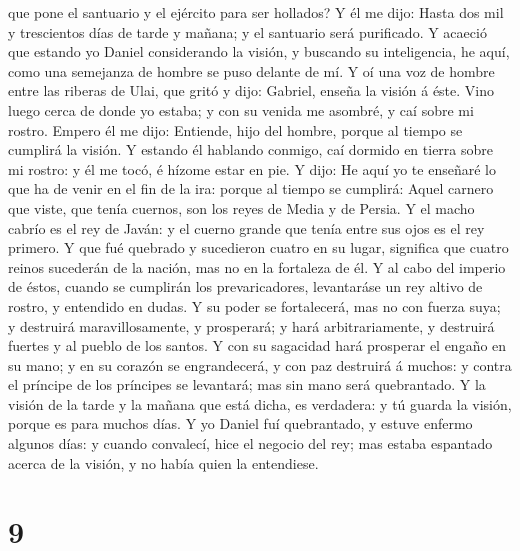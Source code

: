 que pone el santuario y el ejército para ser hollados?  Y
él me dijo: Hasta dos mil y trescientos días de tarde y mañana; y el
santuario será purificado.  Y acaeció que estando yo Daniel
considerando la visión, y buscando su inteligencia, he aquí, como una
semejanza de hombre se puso delante de mí.  Y oí una voz de
hombre entre las riberas de Ulai, que gritó y dijo: Gabriel, enseña la
visión á éste.  Vino luego cerca de donde yo estaba; y con
su venida me asombré, y caí sobre mi rostro. Empero él me dijo:
Entiende, hijo del hombre, porque al tiempo se cumplirá la visión.
 Y estando él hablando conmigo, caí dormido en tierra sobre
mi rostro: y él me tocó, é hízome estar en pie.  Y dijo: He
aquí yo te enseñaré lo que ha de venir en el fin de la ira: porque al
tiempo se cumplirá:  Aquel carnero que viste, que tenía
cuernos, son los reyes de Media y de Persia.  Y el macho
cabrío es el rey de Javán: y el cuerno grande que tenía entre sus ojos
es el rey primero.  Y que fué quebrado y sucedieron cuatro
en su lugar, significa que cuatro reinos sucederán de la nación, mas no
en la fortaleza de él.  Y al cabo del imperio de éstos,
cuando se cumplirán los prevaricadores, levantaráse un rey altivo de
rostro, y entendido en dudas.  Y su poder se fortalecerá,
mas no con fuerza suya; y destruirá maravillosamente, y prosperará; y
hará arbitrariamente, y destruirá fuertes y al pueblo de los santos.
 Y con su sagacidad hará prosperar el engaño en su mano; y
en su corazón se engrandecerá, y con paz destruirá á muchos: y contra el
príncipe de los príncipes se levantará; mas sin mano será quebrantado.
 Y la visión de la tarde y la mañana que está dicha, es
verdadera: y tú guarda la visión, porque es para muchos días.
 Y yo Daniel fuí quebrantado, y estuve enfermo algunos
días: y cuando convalecí, hice el negocio del rey; mas estaba espantado
acerca de la visión, y no había quien la entendiese.

\hypertarget{section-8}{%
\section{9}\label{section-8}}

